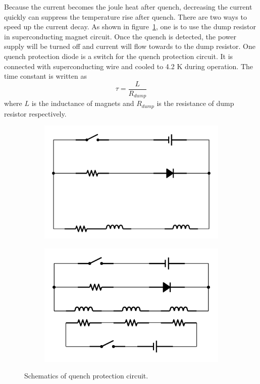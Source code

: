 Because the current becomes the joule heat after quench, decreasing the current quickly can suppress the temperature rise after quench.
There are two ways to speed up the current decay.
As shown in figure~\ref{dump}, one is to use the dump resistor in superconducting magnet circuit.
Once the quench is detected, the power supply will be turned off and current will flow towards to the dump resistor.
One quench protection diode is a switch for the quench protection circuit.
It is connected with superconducting wire and cooled to 4.2 K during operation.
The time constant is written as
\begin{equation}
 \tau = \frac{L}{R_{dump}}
\end{equation}
where $L$ is the inductance of magnets and $R_{dump}$ is the resistance of dump resistor respectively.
\begin{figure}[H]
 \begin{subfigure}{0.3\textwidth}
 \centering
 \includegraphics[scale=0.38]{chapter2/fig/dump.pdf}
 \end{subfigure}
 \hspace{0.2\textwidth}
 \begin{subfigure}{0.3\textwidth}
 \centering
 \includegraphics[scale=0.38]{chapter2/fig/heater.pdf}
 \end{subfigure}
 \caption{Schematics of quench protection circuit.}
 \label{dump}
\end{figure}
